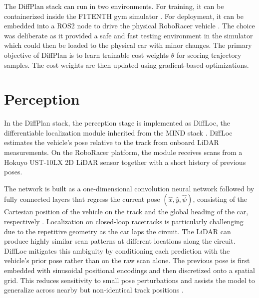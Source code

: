 The DiffPlan stack can run in two environments.
For training, it can be containerized inside the F1TENTH gym simulator \cite{okelly_F1TENTHOpensourceEvaluation_2019, dosovitskiy_CARLAOpenUrban_2017}.
For deployment, it can be embedded into a ROS2 node to drive the physical RoboRacer vehicle \cite{kabzan_AMZDriverlessFull_2020}.
The choice was deliberate as it provided a safe and fast testing environment in the simulator which could then be loaded to the physical car with minor changes.  
The primary objective of DiffPlan is to learn trainable cost weights \(\theta\) for scoring trajectory samples. 
The cost weights are then updated using gradient-based optimizations.

\section{Perception}
\label{section:DiffPlanPerception}

In the DiffPlan stack, the perception stage is implemented as DiffLoc, the differentiable localization module inherited from the MIND stack \cite{jahncke_MINDStackModularInterpretable_2025, swadiryus_DifferentiableMotionPlanning_2025}.
DiffLoc estimates the vehicle's pose relative to the track from onboard LiDAR measurements.
On the RoboRacer platform, the module receives scans from a Hokuyo UST-10LX 2D LiDAR sensor together with a short history of previous poses.

The network is built as a one-dimensional convolution neural network followed by fully connected layers that regress the current pose $(\hat{x}, \hat{y}, \hat{\psi})$, consisting of the Cartesian position of the vehicle on the track and the global heading of the car, respectively \cite{jahncke_MINDStackModularInterpretable_2025, swadiryus_DifferentiableMotionPlanning_2025}.
Localization on closed-loop racetracks is particularly challenging due to the repetitive geometry as the car laps the circuit.
The LiDAR can produce highly similar scan patterns at different locations along the circuit.
DiffLoc mitigates this ambiguity by conditioning each prediction with the vehicle's prior pose rather than on the raw scan alone.
The previous pose is first embedded with sinusoidal positional encodings and then discretized onto a spatial grid.
This reduces sensitivity to small pose perturbations and assists the model to generalize across nearby but non-identical track positions \cite{swadiryus_DifferentiableMotionPlanning_2025}.

